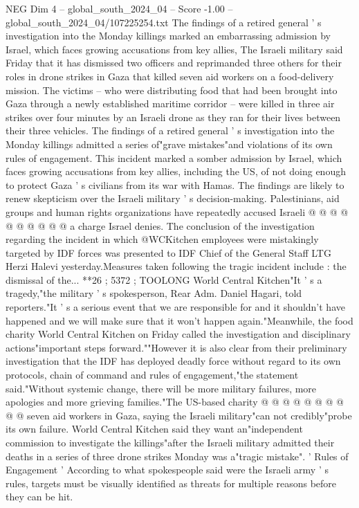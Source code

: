 \begin{textsample}{NEG Dim 4 – global\_south\_2024\_04 – Score -1.00 – global\_south\_2024\_04/107225254.txt}  \label{ex:f4_neg_195}
The findings of a retired general ' s investigation into the Monday killings marked an embarrassing admission by Israel, which faces growing accusations from key allies, The Israeli military said Friday that it has dismissed two officers and reprimanded three others for their roles in drone strikes in Gaza that killed seven aid workers on a food-delivery mission.
The victims -- who were distributing food that had been brought into Gaza through a newly established maritime corridor -- were killed in three air strikes over four minutes by an Israeli drone as they ran for their lives between their three vehicles.
The findings of a retired general ' s investigation into the Monday killings admitted a series of"grave mistakes"and violations of its own rules of engagement.
This incident marked a somber admission by Israel, which faces growing accusations from key allies, including the US, of not doing enough to protect Gaza ' s civilians from its war with Hamas.
The findings are likely to renew skepticism over the Israeli military ' s decision-making.
Palestinians, aid groups and human rights organizations have repeatedly accused Israeli @ @ @ @ @ @ @ @ @ @ a charge Israel denies.
The conclusion of the investigation regarding the incident in which @WCKitchen employees were mistakingly targeted by IDF forces was presented to IDF Chief of the General Staff LTG Herzi Halevi yesterday.Measures taken following the tragic incident include : the dismissal of the... **26 ; 5372 ; TOOLONG World Central Kitchen"It ' s a tragedy,"the military ' s spokesperson, Rear Adm.
Daniel Hagari, told reporters."It ' s a serious event that we are responsible for and it shouldn't have happened and we will make sure that it won't happen again."Meanwhile, the food charity World Central Kitchen on Friday called the investigation and disciplinary actions"important steps forward.""However it is also clear from their preliminary investigation that the IDF has deployed deadly force without regard to its own protocols, chain of command and rules of engagement,"the statement said."Without systemic change, there will be more military failures, more apologies and more grieving families."The US-based charity @ @ @ @ @ @ @ @ @ @ seven aid workers in Gaza, saying the Israeli military"can not credibly"probe its own failure.
World Central Kitchen said they want an"independent commission to investigate the killings"after the Israeli military admitted their deaths in a series of three drone strikes Monday was a"tragic mistake". ' Rules of Engagement ' According to what spokespeople said were the Israeli army ' s rules, targets must be visually identified as threats for multiple reasons before they can be hit.

\end{textsample}
